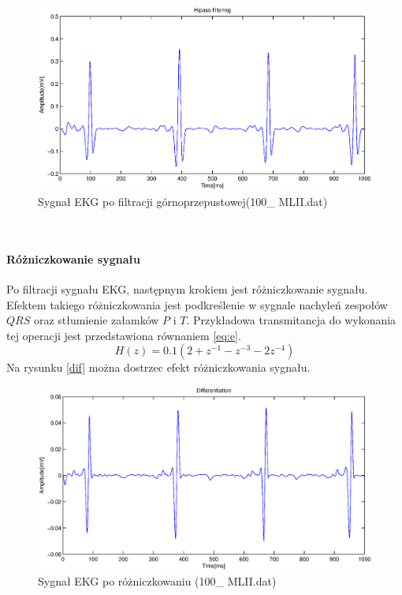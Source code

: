 \documentclass[a4paper, 11pt]{article}
\begin{document}
\begin{figure}[h]
\centering
\includegraphics[scale=0.5]{include/hipass.eps}
\caption{Sygnał EKG po filtracji górnoprzepustowej(100\_ MLII.dat)}
\label{hipass}
\end{figure}\\
\paragraph{Różniczkowanie sygnału}
Po filtracji sygnału EKG, następnym krokiem jest różniczkowanie sygnału. Efektem takiego różniczkowania jest podkreślenie w sygnale nachyleń zespołów $QRS$ oraz stłumienie załamków $P$ i $T$. Przykładowa transmitancja do wykonania tej operacji jest przedstawiona równaniem \eqref{eq:e}.
\begin{equation}
H(z) = 0.1(2+z^{-1} - z^{-3} - 2z^{-4})\label{eq:e}
\end{equation}
\indent Na rysunku \eqref{dif} można dostrzec efekt różniczkowania sygnału.
\begin{figure}[h]
\centering
\includegraphics[scale=0.5]{include/diferentiation.eps}
\caption{Sygnał EKG po różniczkowaniu (100\_ MLII.dat)}
\label{dif}
\end{figure}\\
\end{document}

